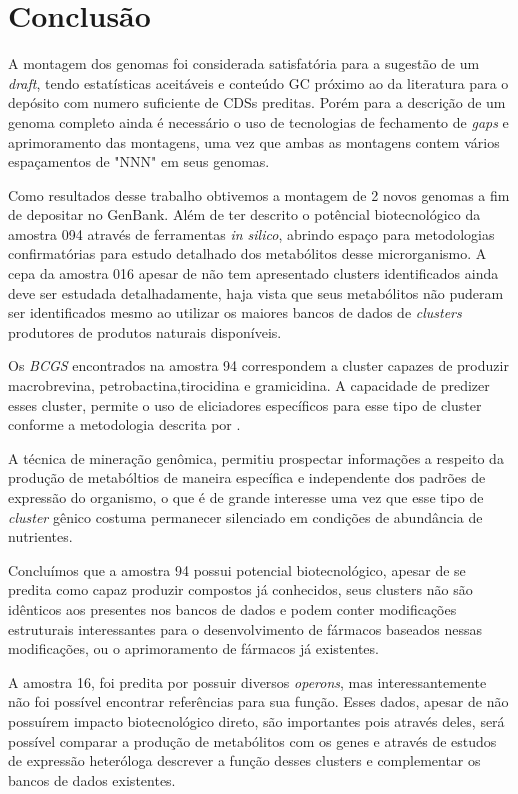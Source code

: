 \chapter{Conclusão}
\label{conclusao}


A montagem dos genomas foi considerada satisfatória para a sugestão de um \textit{draft}, tendo
estatísticas aceitáveis e conteúdo GC próximo ao da literatura para o depósito com numero suficiente de CDSs preditas. Porém para a descrição
de um genoma completo ainda é necessário o uso de tecnologias de fechamento de \textit{gaps} e aprimoramento
das montagens, uma vez que ambas as montagens contem vários espaçamentos de "NNN" em seus genomas.

Como resultados desse trabalho obtivemos a montagem de 2 novos genomas a fim de depositar no GenBank. Além de ter descrito o potêncial biotecnológico da amostra 094
através de ferramentas \textit{in silico}, abrindo espaço para metodologias confirmatórias para
estudo detalhado dos metabólitos desse microrganismo. A cepa da amostra 016 apesar de não tem apresentado
clusters identificados ainda deve ser estudada detalhadamente, haja vista que seus metabólitos não puderam
ser identificados mesmo ao utilizar os maiores bancos de dados de \textit{clusters} produtores de produtos naturais disponíveis.

Os \textit{BCGS} encontrados na amostra 94 correspondem a cluster capazes de produzir macrobrevina,
petrobactina,tirocidina e gramicidina. A capacidade de predizer esses cluster, permite o
uso de eliciadores específicos para esse tipo de cluster conforme a metodologia descrita por .

A técnica de mineração genômica, permitiu prospectar informações a respeito
da produção de metabóltios de maneira específica e independente dos padrões de expressão 
do organismo, o que é de grande interesse uma vez que esse tipo de \textit{cluster} gênico costuma permanecer
silenciado em condições de abundância de nutrientes.

Concluímos que a amostra 94 possui potencial biotecnológico, apesar de se predita 
como capaz produzir compostos já conhecidos, seus clusters não são idênticos aos presentes nos bancos 
de dados e podem conter modificações estruturais interessantes para o desenvolvimento
de fármacos baseados nessas modificações, ou o aprimoramento de fármacos já existentes.

A amostra 16, foi predita por possuir diversos \textit{operons}, mas interessantemente
não foi possível encontrar referências para sua função. Esses dados, apesar de não possuírem
impacto biotecnológico direto, são importantes pois através deles, será possível comparar a produção
de metabólitos com os genes e através de estudos de expressão heteróloga descrever a função
desses clusters e complementar os bancos de dados existentes.

